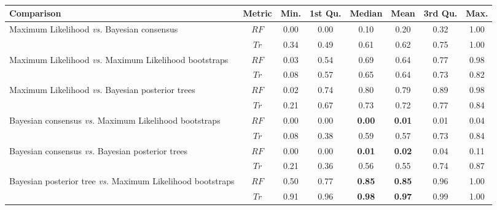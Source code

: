 \documentclass[12pt,letterpaper]{article}
\begin{document}
\begin{landscape}
\begin{table}[!ht]
\caption{}
\centering
\begin{tabular}{|l|c|c|c|c|c|c|c|}
  \hline
 Comparison &  Metric & Min. & 1st Qu. & Median & Mean & 3rd Qu. & Max. \\ 
  \hline
    Maximum Likelihood \textit{vs.} Bayesian consensus                 & $RF$ & 0.00 & 0.00 & 0.10 & 0.20 & 0.32 & 1.00 \\ 
                                                                       & $Tr$ & 0.34 & 0.49 & 0.61 & 0.62 & 0.75 & 1.00 \\ 
    Maximum Likelihood \textit{vs.} Maximum Likelihood bootstraps      & $RF$ & 0.03 & 0.54 & 0.69 & 0.64 & 0.77 & 0.98 \\ 
                                                                       & $Tr$ & 0.08 & 0.57 & 0.65 & 0.64 & 0.73 & 0.82 \\ 
    Maximum Likelihood \textit{vs.} Bayesian posterior trees           & $RF$ & 0.02 & 0.74 & 0.80 & 0.79 & 0.89 & 0.98 \\ 
                                                                       & $Tr$ & 0.21 & 0.67 & 0.73 & 0.72 & 0.77 & 0.84 \\ 
    Bayesian consensus \textit{vs.} Maximum Likelihood bootstraps      & $RF$ & 0.00 & 0.00 & \textbf{0.00} & \textbf{0.01} & 0.01 & 0.04 \\ 
                                                                       & $Tr$ & 0.08 & 0.38 & 0.59 & 0.57 & 0.73 & 0.84 \\ 
    Bayesian consensus \textit{vs.} Bayesian posterior trees           & $RF$ & 0.00 & 0.00 & \textbf{0.01} & \textbf{0.02} & 0.04 & 0.11 \\ 
                                                                       & $Tr$ & 0.21 & 0.36 & 0.56 & 0.55 & 0.74 & 0.87 \\ 
    Bayesian posterior tree \textit{vs.} Maximum Likelihood bootstraps & $RF$ & 0.50 & 0.77 & \textbf{0.85} & \textbf{0.85} & 0.96 & 1.00 \\ 
                                                                       & $Tr$ & 0.91 & 0.96 & \textbf{0.98} & \textbf{0.97} & 0.99 & 1.00 \\ 
   \hline
\end{tabular}
\label{Tab_Results-Difference_methods}
\end{table}
\end{landscape}
\end{document}
